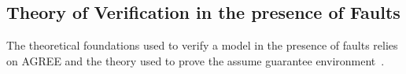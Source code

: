 \subsection{Theory of Verification in the presence of Faults}
\label{sec:verify_theory}
The theoretical foundations used to verify a model in the presence of faults relies on AGREE and the theory used to prove the assume guarantee environment~\cite{cofer2012compositional}. 

\begin{comment}

Assuming that dependent faults have been collected and mapped appropriately, they are in the following form: \\
$\{\{f_1 \rightarrow\{f_3, f_7\}, f_5 \rightarrow\{f_2\},...\}$ meaning that $f_3$ and $f_7$ are dependent on $f_1$ and so on.

We make the assumption that there are no nested dependencies. To clarify this, we cannot have something of the form: \\
$f_1 \rightarrow \{f_3, f_5\}$\\
$f_3 \rightarrow \{f_4\}$

If this is the case, the user must define the dependency as follows: \\
$f_1 \rightarrow \{f_3, f_4, f_5\}$. 

\begin{algorithm}[H]
	Input: $F$: map between allowable combination $F_i$ and associated probability (initially zero) \;
	Output: $F$: map between allowable combinations with dependencies and associated probability (nonzero) \;
	$newMCS =$ empty list \;
	$p=1$ \;
	\For{all allowable fault combinations $F_i \in F$}{
		Remove $F_i$ from $F$ \;
		\For{all $f_i \in MCS$ }{
		    \If{$f$ is key in dependency map}{
		    	$p = p*prob(f)$ \;
		    	append $f$ to $newMCS$ \;
		    	append dependent faults triggered by $f$ to $newMCS$ \;
		    	\For{all depFaults triggered by $f$ activation}{
		    		\If{depFault $\in MCS$}{
		    			remove depFault from $MCS$ \;
		    		}%
		    	} %
		    } %
		} %
		Append $F_i \rightarrow p$ to $F$ \;
	}%
	return $newMCS$ as the completed MCS \;
	\caption{Incorporate Dependencies}
	\label{alg:dep_alg}
\end{algorithm}

\end{comment}